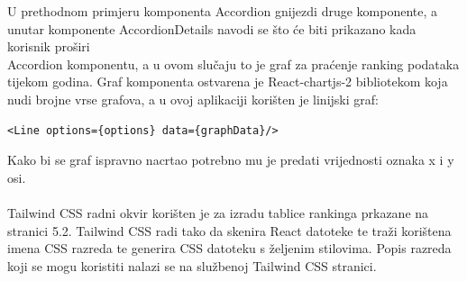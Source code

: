 \documentclass[times, utf8, zavrsni]{fer}
\begin{document}
U prethodnom primjeru komponenta Accordion gnijezdi druge komponente, a unutar komponente AccordionDetails navodi se 
što će biti prikazano kada korisnik proširi \\Accordion komponentu, a u ovom slučaju to je graf za praćenje ranking podataka tijekom godina.
\newpage Graf komponenta ostvarena je React-chartjs-2 bibliotekom koja nudi brojne vrse grafova, a u ovoj aplikaciji korišten je linijski graf:
\begin{lstlisting}
<Line options={options} data={graphData}/>
\end{lstlisting}
Kako bi se graf ispravno nacrtao potrebno mu je predati vrijednosti oznaka x i y osi.
\\\\Tailwind CSS radni okvir korišten je za izradu tablice rankinga prkazane na stranici 5.2. Tailwind CSS radi tako da skenira React datoteke 
te traži korištena imena CSS razreda te generira CSS datoteku s željenim stilovima. Popis razreda koji se mogu koristiti nalazi se na službenoj
Tailwind CSS stranici.
\end{document}
